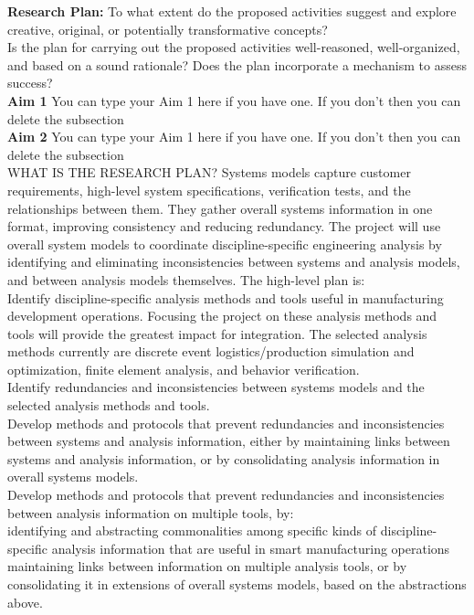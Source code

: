 \documentclass[12pt]{article}
\begin{document}
\noindent
\textbf{Research Plan:} To what extent do the proposed activities suggest and explore creative, original, or potentially transformative concepts?\\
Is the plan for carrying out the proposed activities well-reasoned, well-organized, and based on a sound rationale? Does the plan incorporate a mechanism to assess success?\\
\noindent
\textbf{Aim 1} You can type your Aim 1 here if you have one. If you don't then you can delete the subsection\\
\noindent
\textbf{Aim 2} You can type your Aim 1 here if you have one. If you don't then you can delete the subsection\\




\noindet
WHAT IS THE RESEARCH PLAN?
\noindet
Systems models capture customer requirements, high-level system specifications, verification tests, and the relationships between them. They gather overall systems information in one format, improving consistency and reducing redundancy. The project will use overall system models to coordinate discipline-specific engineering analysis by identifying and eliminating inconsistencies between systems and analysis models, and between analysis models themselves. The high-level plan is:\\
\noindet
Identify discipline-specific analysis methods and tools useful in manufacturing development operations. Focusing the project on these analysis methods and tools will provide the greatest impact for integration. The selected analysis methods currently are discrete event logistics/production simulation and optimization, finite element analysis, and behavior verification.\\
\noindet
Identify redundancies and inconsistencies between systems models and the selected analysis methods and tools.\\
\noindet
Develop methods and protocols that prevent redundancies and inconsistencies between systems and analysis information, either by maintaining links between systems and analysis information, or by consolidating analysis information in overall systems models.\\
\noindet
Develop methods and protocols that prevent redundancies and inconsistencies between analysis information on multiple tools, by:\\
\noindet
identifying and abstracting commonalities among specific kinds of discipline-specific analysis information that are useful in smart manufacturing operations\\
\noindet
maintaining links between information on multiple analysis tools, or by consolidating it in extensions of overall systems models, based on the abstractions above.\\
\end{document}
